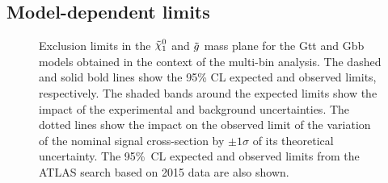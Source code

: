 \subsection{Model-dependent limits}

\begin{figure}[htbp]
	\centering 
	\caption{Exclusion limits in the $\ninoone$ and $\tilde{g}$ mass plane
  		for the  Gtt and   Gbb models obtained
		in the context of the multi-bin analysis. The dashed and solid bold lines
		show the 95\% CL expected and observed limits, respectively. The
  		shaded bands around the expected limits show the
                impact of the
  		experimental and background uncertainties. The dotted
  		lines show the impact on the observed limit of the variation of the
  		nominal signal cross-section by $\pm 1 \sigma$ of its theoretical
  		uncertainty. 
		The 95\%~CL expected and observed limits from the ATLAS search based on 2015 data 
  		\cite{Aad:2016eki} are also shown.}
	\label{fig:limits_GbbGtt}
\end{figure}


